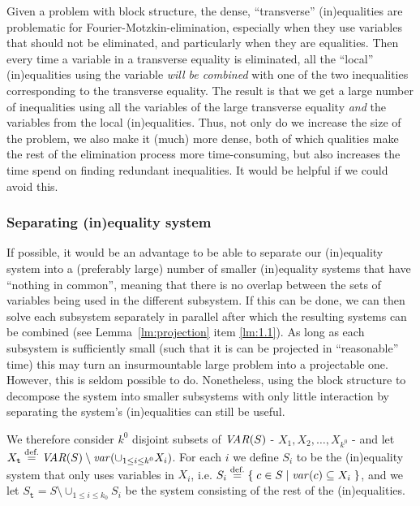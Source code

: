 Given a problem with block structure, the dense, ``transverse'' (in)equalities are problematic for Fourier-Motzkin-elimination, especially when they use variables that should not be eliminated, and particularly when they are equalities. 
Then every time a variable in a transverse equality is eliminated, all the ``local'' (in)equalities using the variable \emph{will be combined} with one of the two inequalities corresponding to the transverse equality. The result is that we get a large number of inequalities using all the variables of the large transverse equality \emph{and} the variables from the local (in)equalities. Thus, not only do we increase the size of the problem, we also make it (much) more dense, both of which qualities make the rest of the elimination process more time-consuming, but also increases the time spend on finding redundant inequalities.
%
{It would be helpful if we could avoid this.}


\subsubsection{Separating (in)equality system}
If possible, it would be an advantage to be able to separate our (in)equality system into a (preferably large) number of smaller (in)equality systems that have ``nothing in common'', meaning that there is no overlap between the sets of variables being used in the different subsystem. If this can be done, we can then solve each subsystem separately in parallel after which the resulting systems can be combined (see Lemma~\ref{lm:projection} item \ref{lm:1.1}). As long as each subsystem is sufficiently small (such that it is can be projected in ``reasonable'' time) this may turn an insurmountable large problem into a projectable one. 
However, this is seldom possible to do. Nonetheless, using the block structure to decompose the system into smaller subsystems with only little interaction by separating the system's (in)equalities can still be useful. 
 
We therefore consider $k^0$ disjoint subsets of $\mathit{VAR}(S)$ - $X_1, X_2,\ldots, X_{k^0}$ - and let $X_{\texttt{t}}\overset{\text{def.}}= \mathit{VAR}(S)\setminus \mathit{var}(\cup_{1\leq i\leq k^0}X_i)$. For each $i$ we define $S_i$ to be the (in)equality system that only uses variables in $X_i$, i.e. $S_i \overset{\text{def.}}= \{\;{c\in S}\;|\;{\mathit{var}(c)\subseteq X_i}\;\}$, and we let $S_\texttt{t} = S\setminus \cup_{1\leq i \leq k_0}S_i$ be the system consisting of the rest of the (in)equalities. 

